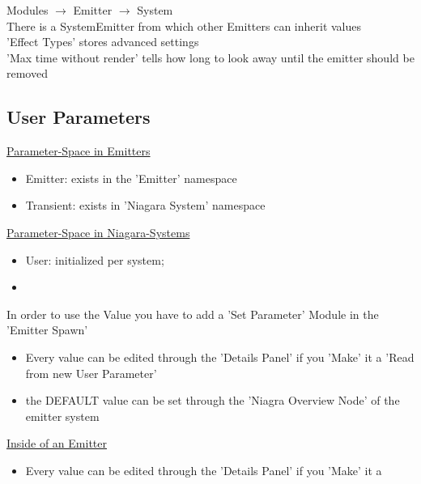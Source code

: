             Modules $\rightarrow$ Emitter $\rightarrow$ System \\
            There is a SystemEmitter from which other Emitters can inherit values \\
            'Effect Types' stores advanced settings \\
            'Max time without render' tells how long to look away until the emitter should be removed \\

        \subsection{User Parameters}
            \underline{Parameter-Space in Emitters}
            \begin{itemize}
                \item Emitter: exists in the 'Emitter' namespace
                \item Transient: exists in 'Niagara System' namespace
            \end{itemize}
\bigskip
\bigskip
            \underline{Parameter-Space in Niagara-Systems}
            \begin{itemize}
                \item User: initialized per system;  
                \item 
            \end{itemize}


            In order to use the Value you have to add a 'Set Parameter' Module in the 'Emitter Spawn'



            \begin{itemize}
                \item Every value can be edited through the 'Details Panel' if you 'Make' it a 'Read from new User Parameter'
                \item the DEFAULT value can be set through the 'Niagra Overview Node' of the emitter system
            \end{itemize}

            \underline{Inside of an Emitter}
            \begin{itemize}
                \item Every value can be edited through the 'Details Panel' if you 'Make' it a 
            \end{itemize}
            

